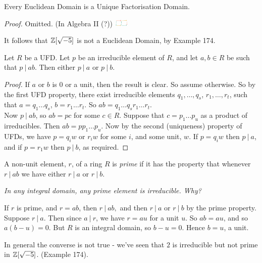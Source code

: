  
  \begin{theorem} Every Euclidean Domain is a Unique Factorisation Domain. %
  \end{theorem}

\noindent   \textit{Proof.} Omitted. (In Algebra II (?)) \includegraphics[width=0.05\textwidth]{al2.jpg} 

It follows that $\mathbb{Z}[\sqrt{-5}]$ is not a Euclidean Domain, by Example 174.


\begin{proposition} Let $R$ be a UFD. Let $p$ be an irreducible element of $R$, and let $a,b\in R$ be such that $p ~|~ ab$. Then either $p~|~ a$ or $p~|~ b$.	
\end{proposition}

\begin{proof}
If $a$ or $b$ is $0$ or a unit, then the result is clear. So assume otherwise. So by the first UFD property, there exist irreducible elements $q_1,\dots,q_s$, $r_1,\dots,r_t$, such that $a = q_1\dots q_s$, $b= r_1\dots r_t.$ So $ab = q_1\dots q_s r_1 \dots r_t$.\vspace*{5pt}\\ Now $p~|~ ab$, so $ab = pc$ for some $c \in R$. Suppose that $c = p_1\dots p_u$ as a product of irreducibles. Then $ab = pp_1\dots p_u$. Now by the second (uniqueness) property of UFDs, we have $p = q_iw$ or $r_i w$ for some $i$, and some unit, $w$. If $p = q_iw$ then $p~|~ a$, and if $p = r_1w$ then $p ~|~b$, as required.
\end{proof}

\begin{definition} A non-unit element, $r$, of a ring $R$ is \emph{prime} if it has the property that whenever $r ~|~ab$ we have either $r~|~ a$ or $r~|~b$.	
\end{definition}\vspace*{5pt}

\noindent \textit{In any integral domain, any prime element is irreducible. Why?}

If $r$ is prime, and $r = ab$, then $r ~|~ ab,$ and then $r~|~ a$ or $r~|~b$ by the prime property. Suppose $r~|~a$. Then since $a ~|~ r$, we have $r = au$ for a unit $u$. So $ab = au$, and so $a(b-u) = 0$. But $R$ is an integral domain, so $b - u =0$. Hence $b = u$, a unit.

In general the converse is not true - we've seen that $2$ is irreducible but not prime in $\mathbb{Z}[\sqrt{-5}]$. (Example 174).\\

